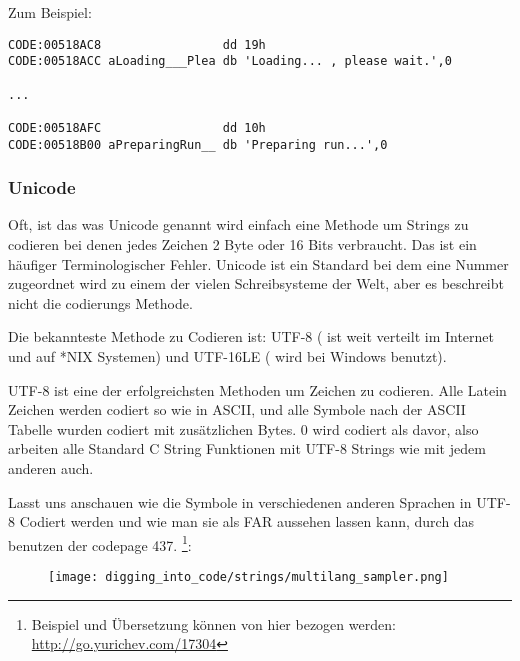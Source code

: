 Zum Beispiel:

\begin{lstlisting}[caption=Delphi,style=customasmx86]
CODE:00518AC8                 dd 19h
CODE:00518ACC aLoading___Plea db 'Loading... , please wait.',0

...

CODE:00518AFC                 dd 10h
CODE:00518B00 aPreparingRun__ db 'Preparing run...',0
\end{lstlisting}

\subsubsection{Unicode}


Oft, ist das was Unicode genannt wird einfach eine Methode um Strings zu codieren bei denen jedes Zeichen 2 Byte oder 
16 Bits verbraucht. Das ist ein häufiger Terminologischer Fehler. Unicode ist ein Standard bei dem eine Nummer zugeordnet
wird zu einem der vielen Schreibsysteme der Welt, aber es beschreibt nicht die codierungs Methode. 


Die bekannteste Methode zu Codieren ist: UTF-8 ( ist weit verteilt im Internet und auf *NIX Systemen) und UTF-16LE ( wird bei Windows benutzt). 


UTF-8 ist eine der erfolgreichsten Methoden um Zeichen zu codieren.
Alle Latein Zeichen werden codiert so wie in ASCII, und alle Symbole nach der
ASCII Tabelle wurden codiert mit zusätzlichen Bytes. 0 wird codiert als davor,
also arbeiten alle Standard C String Funktionen mit UTF-8 Strings wie mit jedem anderen auch.

Lasst uns anschauen wie die Symbole in verschiedenen anderen Sprachen in UTF-8 Codiert werden und  %
wie man sie als FAR aussehen lassen kann, durch das benutzen der codepage 437.
\footnote{Beispiel und Übersetzung können von hier bezogen werden:  
\url{http://go.yurichev.com/17304}}:

\begin{figure}[H]
\centering
\texttt{[image: digging\_into\_code/strings/multilang\_sampler.png]}
\end{figure}

